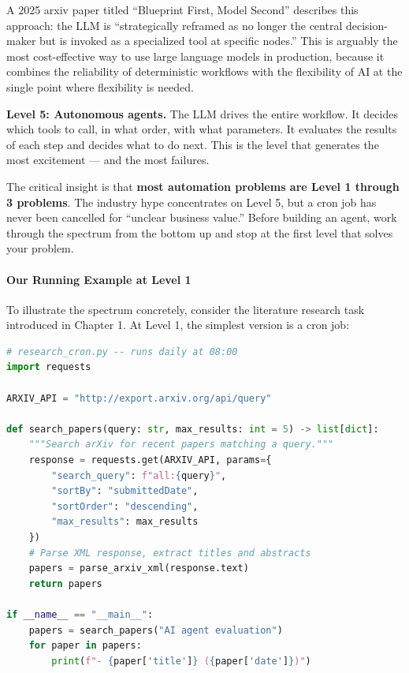 \documentclass[11pt, a4paper]{article}
\begin{document}
A 2025 arxiv paper titled ``Blueprint First, Model Second'' describes
this approach: the LLM is ``strategically reframed as no longer the
central decision-maker but is invoked as a specialized tool at specific
nodes.'' This is arguably the most cost-effective way to use large
language models in production, because it combines the reliability of
deterministic workflows with the flexibility of AI at the single point
where flexibility is needed.

\textbf{Level 5: Autonomous agents.} The LLM drives the entire workflow.
It decides which tools to call, in what order, with what parameters. It
evaluates the results of each step and decides what to do next. This is
the level that generates the most excitement --- and the most failures.

The critical insight is that \textbf{most automation problems are Level
1 through 3 problems}. The industry hype concentrates on Level 5, but a
cron job has never been cancelled for ``unclear business value.'' Before
building an agent, work through the spectrum from the bottom up and stop
at the first level that solves your problem.

\hypertarget{our-running-example-at-level-1}{%
\paragraph{Our Running Example at Level
1}\label{our-running-example-at-level-1}}

To illustrate the spectrum concretely, consider the literature research
task introduced in Chapter 1. At Level 1, the simplest version is a cron
job:

\begin{lstlisting}[language=Python]
# research_cron.py -- runs daily at 08:00
import requests

ARXIV_API = "http://export.arxiv.org/api/query"

def search_papers(query: str, max_results: int = 5) -> list[dict]:
    """Search arXiv for recent papers matching a query."""
    response = requests.get(ARXIV_API, params={
        "search_query": f"all:{query}",
        "sortBy": "submittedDate",
        "sortOrder": "descending",
        "max_results": max_results
    })
    # Parse XML response, extract titles and abstracts
    papers = parse_arxiv_xml(response.text)
    return papers

if __name__ == "__main__":
    papers = search_papers("AI agent evaluation")
    for paper in papers:
        print(f"- {paper['title']} ({paper['date']})")
\end{lstlisting}
\end{document}
